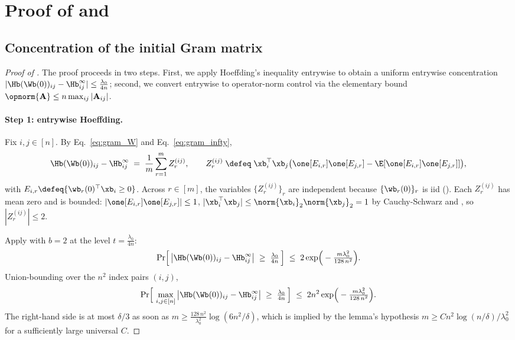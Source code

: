 \section{Proof of \texorpdfstring{}{Lemma 1} and \texorpdfstring{}{the initial residual bound}}\label{sec:proof_init_gram}

\subsection{Concentration of the initial Gram matrix}\label{subsec:init_gram}

\begin{proof}[Proof of ]
The proof proceeds in two steps. First, we apply Hoeffding's inequality entrywise to obtain a uniform entrywise concentration $|\Hb(\Wb(0))_{ij} - \Hb^\infty_{ij}| \le \tfrac{\lambda_0}{4 n}$; second, we convert entrywise to operator-norm control via the elementary bound $\opnorm{\mathbf A} \le n \max_{ij} |\mathbf A_{ij}|$.

\paragraph{Step 1: entrywise Hoeffding.}
Fix $i, j \in [n]$. By Eq.~\eqref{eq:gram_W} and Eq.~\eqref{eq:gram_infty},
\begin{align}\label{eq:Hij_dif}
\Hb(\Wb(0))_{ij} - \Hb^\infty_{ij}
\;=\; \frac{1}{m} \sum_{r=1}^m Z_r^{(ij)},
\qquad
Z_r^{(ij)} \;\defeq\; \xb_i^\top \xb_j \big( \one[E_{i,r}] \one[E_{j,r}] - \E[ \one[E_{i,r}] \one[E_{j,r}] ] \big),
\end{align}
with $E_{i,r} \defeq \{ \wb_r(0)^\top \xb_i \ge 0 \}$. Across $r \in [m]$, the variables $\{Z_r^{(ij)}\}_r$ are independent because $\{\wb_r(0)\}_r$ is iid (). Each $Z_r^{(ij)}$ has mean zero and is bounded: $|\one[E_{i,r}] \one[E_{j,r}]| \le 1$, $|\xb_i^\top \xb_j| \le \norm{\xb_i}_2 \norm{\xb_j}_2 = 1$ by Cauchy-Schwarz and , so $|Z_r^{(ij)}| \le 2$.

Apply  with $b = 2$ at the level $t = \tfrac{\lambda_0}{4 n}$:
\begin{align*}
\Pr\!\Big[ \, \big|\Hb(\Wb(0))_{ij} - \Hb^\infty_{ij}\big| \;\ge\; \tfrac{\lambda_0}{4 n} \, \Big]
\;\le\; 2 \exp\!\Big( - \tfrac{m \lambda_0^2}{128 \, n^2} \Big).
\end{align*}
Union-bounding over the $n^2$ index pairs $(i,j)$,
\begin{align}\label{eq:entrywise_union}
\Pr\!\Big[ \, \max_{i, j \in [n]} \big|\Hb(\Wb(0))_{ij} - \Hb^\infty_{ij}\big| \;\ge\; \tfrac{\lambda_0}{4 n} \, \Big]
\;\le\; 2 n^2 \exp\!\Big( - \tfrac{m \lambda_0^2}{128 \, n^2} \Big).
\end{align}
The right-hand side is at most $\delta/3$ as soon as $m \ge \tfrac{128 \, n^2}{\lambda_0^2} \log(6 n^2 / \delta)$, which is implied by the lemma's hypothesis $m \ge C n^2 \log(n/\delta) / \lambda_0^2$ for a sufficiently large universal $C$.


\end{proof}
